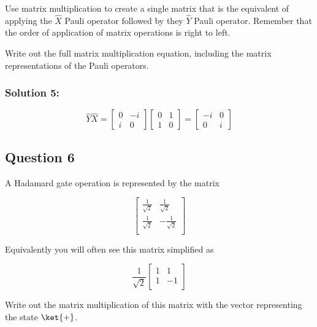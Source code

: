 \documentclass{article}
\begin{document}
Use matrix multiplication to create a single matrix that is the equivalent of applying the $\hat{X}$ Pauli operator followed by they $\hat{Y}$ Pauli operator. Remember that the order of application of matrix operations is right to left.

Write out the full matrix multiplication equation, including the matrix representations of the Pauli operators.

\subsubsection*{Solution 5:}

\[\hat Y\hat X=\begin{bmatrix}0&-i\\i&0\end{bmatrix}\begin{bmatrix}0&1\\1&0\end{bmatrix}=\begin{bmatrix}-i&0\\0&i\end{bmatrix}\]

\subsection*{Question 6}

A Hadamard gate operation is represented by the matrix

\begin{equation*}
    \begin{bmatrix}
        \frac{1}{\sqrt{2}} & \frac{1}{\sqrt{2}} \\
        \frac{1}{\sqrt{2}} & -\frac{1}{\sqrt{2}} \\
    \end{bmatrix}
\end{equation*}

Equivalently you will often see this matrix simplified as

\begin{equation*}
    \frac{1}{\sqrt{2}}
    \begin{bmatrix}
        1 & 1 \\
        1 & -1 \\
    \end{bmatrix}
\end{equation*}

Write out the matrix multiplication of this matrix with the vector representing the state $\ket{+}$.
\end{document}
